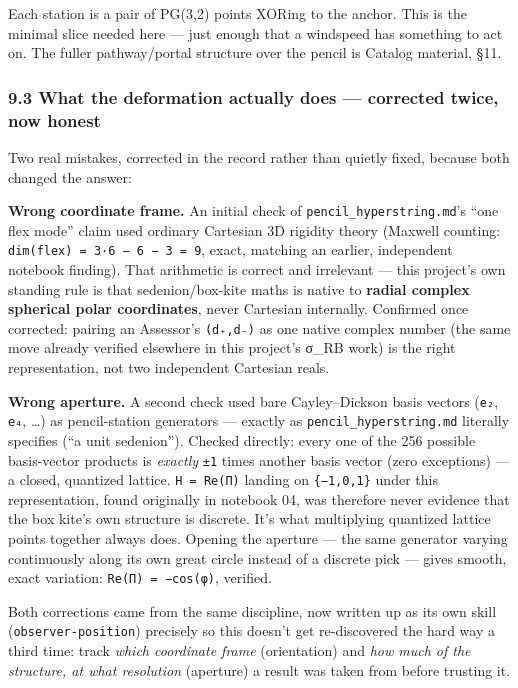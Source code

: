 \documentclass[
  10pt,
]{article}
\begin{document}
Each station is a pair of PG(3,2) points XORing to the anchor. This is
the minimal slice needed here --- just enough that a windspeed has
something to act on. The fuller pathway/portal structure over the pencil
is Catalog material, §11.

\hypertarget{what-the-deformation-actually-does-corrected-twice-now-honest}{%
\subsubsection{9.3 What the deformation actually does --- corrected
twice, now
honest}\label{what-the-deformation-actually-does-corrected-twice-now-honest}}

Two real mistakes, corrected in the record rather than quietly fixed,
because both changed the answer:

\textbf{Wrong coordinate frame.} An initial check of
\texttt{pencil\_hyperstring.md}'s ``one flex mode'' claim used ordinary
Cartesian 3D rigidity theory (Maxwell counting:
\texttt{dim(flex)\ =\ 3·6\ −\ 6\ −\ 3\ =\ 9}, exact, matching an
earlier, independent notebook finding). That arithmetic is correct and
irrelevant --- this project's own standing rule is that
sedenion/box-kite maths is native to \textbf{radial complex spherical
polar coordinates}, never Cartesian internally. Confirmed once
corrected: pairing an Assessor's \texttt{(d₊,d₋)} as one native complex
number (the same move already verified elsewhere in this project's σ\_RB
work) is the right representation, not two independent Cartesian reals.

\textbf{Wrong aperture.} A second check used bare Cayley--Dickson basis
vectors (\texttt{e₂}, \texttt{e₄}, \ldots) as pencil-station generators
--- exactly as \texttt{pencil\_hyperstring.md} literally specifies (``a
unit sedenion''). Checked directly: every one of the 256 possible
basis-vector products is \emph{exactly} \texttt{±1} times another basis
vector (zero exceptions) --- a closed, quantized lattice.
\texttt{H\ =\ Re(Π)} landing on \texttt{\{−1,0,1\}} under this
representation, found originally in notebook 04, was therefore never
evidence that the box kite's own structure is discrete. It's what
multiplying quantized lattice points together always does. Opening the
aperture --- the same generator varying continuously along its own great
circle instead of a discrete pick --- gives smooth, exact variation:
\texttt{Re(Π)\ =\ −cos(φ)}, verified.

Both corrections came from the same discipline, now written up as its
own skill (\texttt{observer-position}) precisely so this doesn't get
re-discovered the hard way a third time: track \emph{which coordinate
frame} (orientation) and \emph{how much of the structure, at what
resolution} (aperture) a result was taken from before trusting it.
\end{document}
